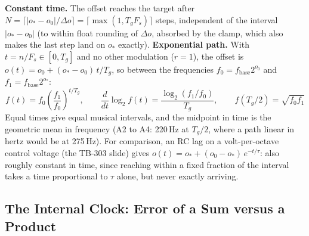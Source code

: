 \documentclass[11pt,letterpaper]{article}
\newcommand{\Fs}{F_s}
\begin{document}
\textbf{Constant time.} The offset reaches the target after $N = \lceil |o_\ast - o_0| / \Delta o \rceil = \lceil \max(1, T_g\Fs) \rceil$ steps,
independent of the interval $|o_\ast - o_0|$ (to within float rounding of $\Delta o$, absorbed by the clamp, which also makes the last
step land on $o_\ast$ exactly). \textbf{Exponential path.} With $t = n/\Fs \in [0, T_g]$ and no other modulation ($r = 1$), the offset
is $o(t) = o_0 + (o_\ast - o_0)\,t/T_g$, so between the frequencies $f_0 = f_{\mathrm{base}}2^{o_0}$ and $f_1 = f_{\mathrm{base}}2^{o_\ast}$:
\begin{equation}\label{eq:glidepath}
  f(t) = f_0 \left(\frac{f_1}{f_0}\right)^{t/T_g}, \qquad
  \frac{d}{dt}\log_2 f(t) = \frac{\log_2 (f_1/f_0)}{T_g}, \qquad f(T_g/2) = \sqrt{f_0 f_1}
\end{equation}
Equal times give equal musical intervals, and the midpoint in time is the geometric mean in frequency (A2 to A4: 220\,Hz at
$T_g/2$, where a path linear in hertz would be at 275\,Hz). For comparison, an RC lag on a volt-per-octave control voltage
(the TB-303 slide) gives $o(t) = o_\ast + (o_0 - o_\ast)\,e^{-t/\tau}$: also roughly constant in time, since reaching within a fixed
fraction of the interval takes a time proportional to $\tau$ alone, but never exactly arriving.

\subsection{The Internal Clock: Error of a Sum versus a Product}
\end{document}

